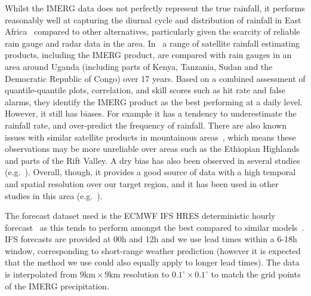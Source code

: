 \documentclass{article}
\begin{document}
Whilst the IMERG data does not perfectly represent the true rainfall, it performs reasonably well at capturing the diurnal cycle and distribution of rainfall in East Africa~\citep{dezfuli_validation_2017, roca_comparing_2010, camberlin_major_2018} compared to other alternatives, particularly given the scarcity of reliable rain gauge and radar data in the area.  In~\cite{ageet_validation_2022} a range of satellite rainfall estimating products, including the IMERG product, are compared with rain gauges in an area around Uganda (including parts of Kenya, Tanzania, Sudan and the Democratic Republic of Congo) over 17 years. Based on a combined assessment of quantile-quantile plots, correlation, and skill scores such as hit rate and false alarms, they identify the IMERG product as the best performing at a daily level. However, it still has biases. For example it has a tendency to underestimate the rainfall rate, and over-predict the frequency of rainfall. There are also known issues with similar satellite products in mountainous areas~\citep{dinku_comparison_2010}, which means these observations may be more unreliable over areas such as the Ethiopian Highlands and parts of the Rift Valley. A dry bias has also been observed in several studies (e.g.~\cite{vogel_skill_2018}). Overall, though, it provides a good source of data with a high temporal and spatial resolution over our target region, and it has been used in other studies in this area (e.g.~\cite{woodhams_what_2018, finney_implications_2019, cafaro_convection-permitting_2021}).

The forecast dataset used is the ECMWF IFS HRES deterministic hourly forecast~\citep{ecmwf_operational_2023} as this tends to perform amongst the best compared to similar models~\citep{haiden_intercomparison_2012}. IFS forecasts are provided at 00h and 12h and we use lead times within a 6-18h window, corresponding to short-range weather prediction (however it is expected that the method we use could also equally apply to longer lead times). The data is interpolated from $9\text{km} \times 9\text{km}$ resolution to $0.1^{\circ} \times 0.1^{\circ}$ to match the grid points of the IMERG precipitation.
\end{document}
